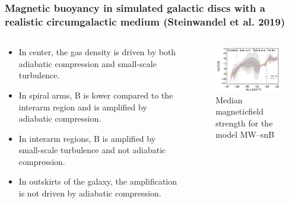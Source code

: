 \documentclass[10pt,aspectratio=169]{beamer}
\begin{document}
\begin{frame}
	\frametitle{Magnetic buoyancy in simulated galactic discs with a realistic circumgalactic medium (Steinwandel et al. 2019)}
	\begin{columns}
		\begin{column}{0.52\textwidth}
			\begin{itemize}
				\item In center, the gas density is driven by both adiabatic compression and small-scale turbulence.
				\item In spiral arms, B is lower compared to the interarm region and is amplified by adiabatic compression.
				\item In interarm regions, B is amplified by small-scale turbulence and not adiabatic compression.
				\item In outskirts of the galaxy, the amplification is not driven by adiabatic compression.
			\end{itemize}
		\end{column}
		\begin{column}{0.46\textwidth}
			\begin{figure}
				\includegraphics[width=7cm]{./images/St2019_B_rho.png}
				\caption{Median magneticfield strength for the model MW–snB}
			\end{figure}
		\end{column}
	\end{columns}
\end{frame}
\end{document}
